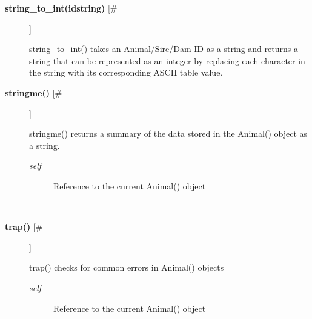 \documentclass[10pt]{article}
\begin{document}
\begin{description}
\item[\textbf{string\_to\_int(idstring)}
 [\#]]

 string\_to\_int() takes an Animal/Sire/Dam ID as a string and returns a string that can be represented as an integer by replacing each character in the string with its corresponding ASCII table value.

\item[\textbf{stringme()}
 [\#]]

 stringme() returns a summary of the data stored in the Animal() object as a string.
\begin{description}
\item[\emph{self}
] Reference to the current Animal() object

\end{description}
\\ 

\item[\textbf{trap()}
 [\#]]

 trap() checks for common errors in Animal() objects
\begin{description}
\item[\emph{self}
] Reference to the current Animal() object

\end{description}
\\ 


\end{description}
\end{document}
